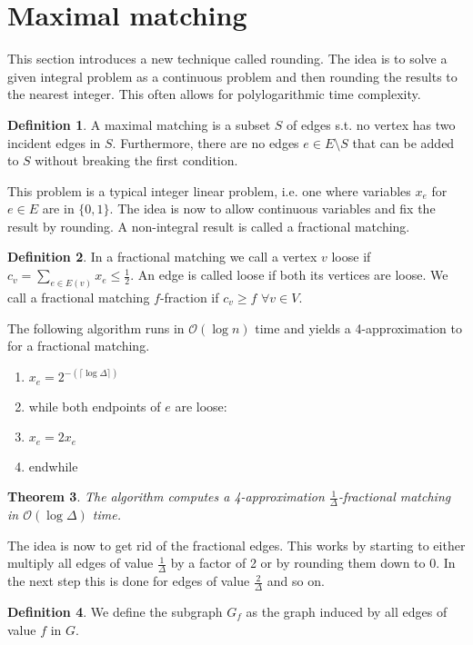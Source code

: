 \documentclass[a4paper, 12pt]{article}
\theoremstyle{plain}
\newtheorem{theorem}{Theorem}[section] %
\theoremstyle{definition}
\newtheorem{definition}[theorem]{Definition} %
\theoremstyle{lemma}
\theoremstyle{remark}
\theoremstyle{corollary}
\theoremstyle{example}
\begin{document}
	\section{Maximal matching}
	This section introduces a new technique called rounding. The idea is to solve a given integral problem as a continuous problem and then rounding the results to the nearest integer. This often allows for polylogarithmic time complexity.
	\begin{definition}
		A maximal matching is a subset $S$ of edges s.t. no vertex has two incident edges in $S$. Furthermore, there are no edges $e \in E\setminus S$ that can be added to $S$ without breaking the first condition. 
	\end{definition}
	This problem is a typical integer linear problem, i.e. one where variables $x_e$ for $e \in E$ are in $\{0,1\}$. The idea is now to allow continuous variables and fix the result by rounding. A non-integral result is called a fractional matching.
	\begin{definition}
		In a fractional matching we call a vertex $v$ loose if $c_v = \sum_{e \in E(v)} x_e \leq \frac{1}{2}$. An edge is called loose if both its vertices are loose. We call a fractional matching $f$-fraction if $c_v \geq f$ $\forall v \in V$.
	\end{definition}
	The following algorithm runs in $\mathcal{O}(\log n)$ time and yields a 4-approximation to for a fractional matching.\\
	\begin{enumerate}
		\item $x_e = 2^{-(\lceil\log \Delta \rceil)}$
		\item while both endpoints of $e$ are loose:
		\item $x_e = 2x_e$
		\item endwhile
	\end{enumerate}
	\begin{theorem}
		The algorithm computes a 4-approximation $\frac{1}{\Delta}$-fractional matching in $\mathcal{O}(\log \Delta)$ time.
	\end{theorem}
	The idea is now to get rid of the fractional edges. This works by starting to either multiply all edges of value $\frac{1}{\Delta}$ by a factor of 2 or by rounding them down to 0. In the next step this is done for edges of value $\frac{2}{\Delta}$ and so on.
	\begin{definition}
		We define the subgraph $G_f$ as the graph induced by all edges of value $f$ in $G$.
	\end{definition}
\end{document}
